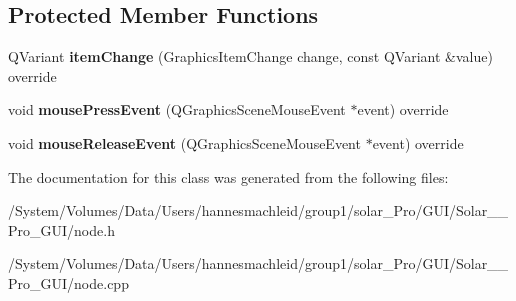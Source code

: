 \subsection*{Protected Member Functions}
\begin{DoxyCompactItemize}
\item 
\mbox{\label{class_node_acf1947b9d09af9870247acc786361ab9}} 
Q\+Variant {\bfseries item\+Change} (Graphics\+Item\+Change change, const Q\+Variant \&value) override
\item 
\mbox{\label{class_node_abdcd9e8130c8147862ca4dc5a26ce93e}} 
void {\bfseries mouse\+Press\+Event} (Q\+Graphics\+Scene\+Mouse\+Event $\ast$event) override
\item 
\mbox{\label{class_node_aa74b1786b7eb1b500749c5d9712717fd}} 
void {\bfseries mouse\+Release\+Event} (Q\+Graphics\+Scene\+Mouse\+Event $\ast$event) override
\end{DoxyCompactItemize}


The documentation for this class was generated from the following files\+:\begin{DoxyCompactItemize}
\item 
/\+System/\+Volumes/\+Data/\+Users/hannesmachleid/group1/solar\+\_\+\+Pro/\+G\+U\+I/\+Solar\+\_\+\+\_\+\+Pro\+\_\+\+G\+U\+I/node.\+h\item 
/\+System/\+Volumes/\+Data/\+Users/hannesmachleid/group1/solar\+\_\+\+Pro/\+G\+U\+I/\+Solar\+\_\+\+\_\+\+Pro\+\_\+\+G\+U\+I/node.\+cpp\end{DoxyCompactItemize}
